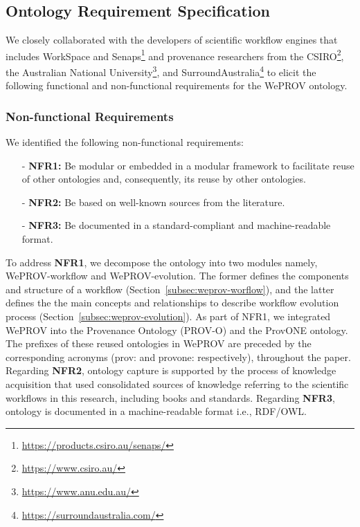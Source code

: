 \documentclass[ao]{iosart2x}
\begin{document}
\subsection{Ontology Requirement Specification}
We closely collaborated with the developers of scientific workflow engines that includes WorkSpace \citep{cleary2015using,bolger2016workspace} and Senaps\footnote{\url{https://products.csiro.au/senaps/}} and provenance researchers from the CSIRO\footnote{\url{https://www.csiro.au/}}, the Australian National University\footnote{\url{https://www.anu.edu.au/}}, and SurroundAustralia\footnote{\url{https://surroundaustralia.com/}} to elicit the following functional and non-functional requirements for the WePROV ontology. 

\subsubsection{Non-functional Requirements}

We identified the following non-functional requirements: 

\begin{enumerate}
    \item[-]\textbf{NFR1:} Be modular or embedded in a modular framework to facilitate reuse of other ontologies and, consequently, its reuse by other ontologies.
    \item[-]\textbf{NFR2:} Be based on well-known sources from the literature. 
    \item[-]\textbf{NFR3:} Be documented in a standard-compliant and machine-readable format.
\end{enumerate}
 To address \textbf{NFR1}, we decompose the ontology into two modules namely, WePROV-workflow and WePROV-evolution. The former defines the components and structure of a workflow (Section~\ref{subsec:weprov-worflow}), and the latter defines the the main concepts and relationships to describe workflow evolution process (Section~\ref{subsec:weprov-evolution}).
 As part of NFR1, we integrated WePROV into the Provenance Ontology (PROV-O) and the ProvONE ontology. The prefixes of these reused ontologies in WePROV are preceded by the corresponding acronyms (prov: and provone: respectively), throughout the paper. %
Regarding \textbf{NFR2}, ontology capture is supported by the process of knowledge acquisition that used consolidated sources of knowledge referring to the scientific workflows in this research, including books and standards. Regarding \textbf{NFR3}, ontology is documented in a machine-readable format i.e., RDF/OWL.
\end{document}

